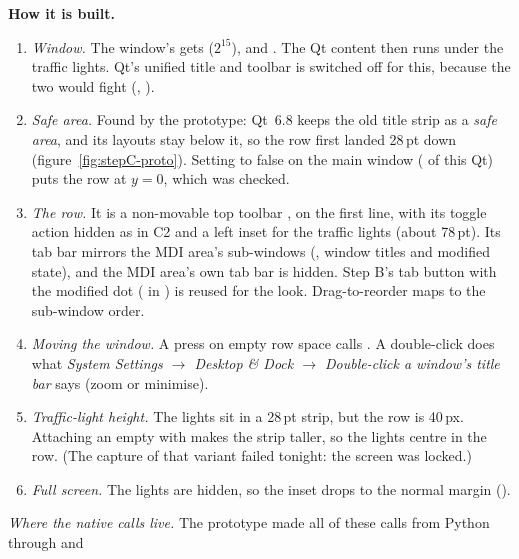 \textbf{How it is built.}
\begin{enumerate}[nosep]
  \item \emph{Window.} The window's  gets 
        ($2^{15}$),  and . The
        Qt content then runs under the traffic lights. Qt's unified title and toolbar is switched off for this,
        because the two would fight (,
        ).
  \item \emph{Safe area.} Found by the prototype: Qt~6.8 keeps the old title strip as a \emph{safe area}, and
        its layouts stay below it, so the row first landed 28\,pt down (figure~\ref{fig:stepC-proto}). Setting
         to false on the main window ( of
        this Qt) puts the row at $y = 0$, which was checked.
  \item \emph{The row.} It is a non-movable top toolbar , on the first line, with its
        toggle action hidden as in C2 and a left inset for the traffic lights (about 78\,pt). Its tab bar mirrors
        the MDI area's sub-windows (, window titles and modified state),
        and the MDI area's own tab bar is hidden. Step B's tab button with the modified dot
        ( in ) is reused for the look. Drag-to-reorder maps to
        the sub-window order.
  \item \emph{Moving the window.} A press on empty row space calls . A double-click
        does what \emph{System Settings $\rightarrow$ Desktop \& Dock $\rightarrow$ Double-click a window's title
        bar} says (zoom or minimise).
  \item \emph{Traffic-light height.} The lights sit in a 28\,pt strip, but the row is 40\,px. Attaching an empty
         with  makes the strip taller, so the lights centre
        in the row. \verify{} (The capture of that variant failed tonight: the screen was locked.)
  \item \emph{Full screen.} The lights are hidden, so the inset drops to the normal margin
        ().
\end{enumerate}
\emph{Where the native calls live.} The prototype made all of these calls from Python through  and
